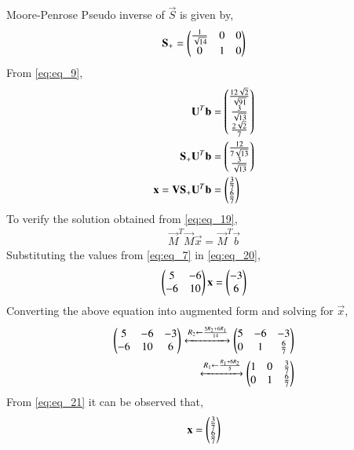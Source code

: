 \documentclass[journal,12pt,twocolumn]{IEEEtran}
\begin{document}
Moore-Penrose Pseudo inverse of $\vec{S}$ is given by,
\begin{align} \label{eq:eq_18}
    \mathbf{S_+} = \begin{pmatrix}\frac{1}{\sqrt{14}} & 0 & 0 \\ 0 & 1 & 0\end{pmatrix}
\end{align}
From \eqref{eq:eq_9},
\begin{align}
    \mathbf{U}^T\mathbf{b} &= \begin{pmatrix}\frac{12\sqrt{2}}{\sqrt{91}} \\ 
    \frac{3}{\sqrt{13}} \\ \frac{2\sqrt{2}}{7}\end{pmatrix} \nonumber \\
    \mathbf{S_+}\mathbf{U}^T\mathbf{b} &= \begin{pmatrix}\frac{12}{7\sqrt{13}} \\ \frac{3}{\sqrt{13}}\end{pmatrix} \nonumber \\
    \mathbf{x} = \mathbf{V}\mathbf{S_+}\mathbf{U}^T\mathbf{b} &= \begin{pmatrix}\frac{3}{7} \\ \frac{6}{7}\end{pmatrix} \label{eq:eq_19}
\end{align}
To verify the solution obtained from \eqref{eq:eq_19},
\begin{align} \label{eq:eq_20}
    \vec{M}^T\vec{M}\vec{x} = \vec{M}^T\vec{b}
\end{align}
Substituting the values from \eqref{eq:eq_7} in \eqref{eq:eq_20},
\begin{align}
    \begin{pmatrix}5 & -6 \\ -6 & 10\end{pmatrix}\mathbf{x} = \begin{pmatrix}-3 \\ 6\end{pmatrix} \nonumber
\end{align}
Converting the above equation into augmented form and solving for $\vec{x}$,
\begin{align}
    \begin{pmatrix}5 & -6 & -3\\ -6 & 10 & 6\end{pmatrix} \xleftrightarrow[]{R_2 \leftarrow \frac{5R_2+6R_1}{14}} \begin{pmatrix}5 & -6 & -3 \\ 0 & 1 & \frac{6}{7}\end{pmatrix} \nonumber \\ \xleftrightarrow[]{R_1 \leftarrow \frac{R_1+6R_2}{5}} \begin{pmatrix}1 & 0 & \frac{3}{7} \\ 0 & 1 & \frac{6}{7}\end{pmatrix} \label{eq:eq_21}
\end{align}
From \eqref{eq:eq_21} it can be observed that,
\begin{align} \label{eq:eq_22}
    \mathbf{x} = \begin{pmatrix}\frac{3}{7} \\ \frac{6}{7}\end{pmatrix} 
\end{align}
\end{document}
